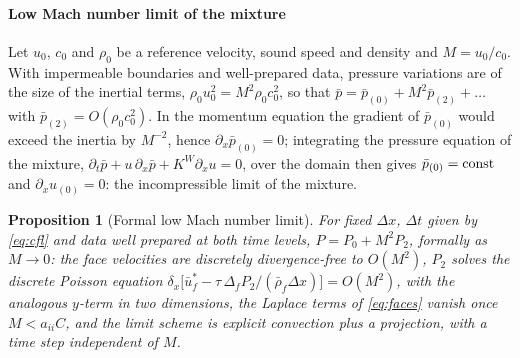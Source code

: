 \documentclass[a4paper,fleqn]{cas-sc}
\newtheorem{proposition}[theorem]{Proposition}
\begin{document}
\paragraph{Low Mach number limit of the mixture}
Let $u_0$, $c_0$ and $\rho_0$ be a reference velocity, sound speed and density and $M=u_0/c_0$. With impermeable
boundaries and well-prepared data, pressure variations are of the size of the inertial terms, $\rho_0u_0^2=M^2\rho_0c_0^2$,
so that $\bar p=\bar p_{(0)}+M^2\bar p_{(2)}+\dots$ with $\bar p_{(2)}=O(\rho_0c_0^2)$. In the momentum equation the gradient of
$\bar p_{(0)}$ would exceed the inertia by $M^{-2}$, hence $\partial_x\bar p_{(0)}=0$; integrating the pressure equation of the
mixture, $\partial_t\bar p+u\,\partial_x\bar p+K^W\partial_xu=0$, over the domain then gives $\bar p_{(0)}={\rm const}$ and
$\partial_xu_{(0)}=0$: the incompressible limit of the mixture.
\begin{proposition}[Formal low Mach number limit]\label{prop:lowmach}
For fixed $\Delta x$, $\Delta t$ given by \eqref{eq:cfl} and data well prepared at both time levels, $P=P_0+M^2P_2$, formally as
$M\to0$: the face velocities are discretely divergence-free to $O(M^2)$, $P_2$ solves the discrete Poisson equation
$\delta_x\big[\bar u^*_f-\tau\,\Delta_fP_2/(\bar\rho_f\Delta x)\big]=O(M^2)$, with the analogous $y$-term in two dimensions, the Laplace terms of
\eqref{eq:faces} vanish once $M<a_{ii}C$, and the limit scheme is explicit convection plus a projection, with a time step
independent of $M$.
\end{proposition}
\end{document}
